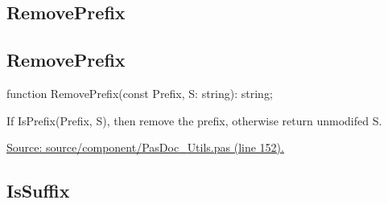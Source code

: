 \documentclass{report}
\newif\ifpdf
\begin{document}
\subsection*{\large{\textbf{RemovePrefix}}\normalsize\hspace{1ex}\hrulefill}
\else
\subsection*{RemovePrefix}
\fi
\label{PasDoc_Utils-RemovePrefix}
\begin{list}{}{
\setlength{\itemindent}{0cm}
\setlength{\listparindent}{0cm}
\setlength{\leftmargin}{\evensidemargin}
\addtolength{\leftmargin}{\tmplength}
\settowidth{\labelsep}{X}
\addtolength{\leftmargin}{\labelsep}
\setlength{\labelwidth}{\tmplength}
}
\item[\textbf{Declaration}\hfill]
\ifpdf
\begin{flushleft}
\fi
\begin{ttfamily}
function RemovePrefix(const Prefix, S: string): string;\end{ttfamily}

\ifpdf
\end{flushleft}
\fi

\par
\item[\textbf{Description}]
If IsPrefix(Prefix, S), then remove the prefix, otherwise return unmodifed S.\par
\href{https://github.com/pasdoc/pasdoc/blob/master/source/component/PasDoc_Utils.pas#L152}{Source: source/component/PasDoc{\_}Utils.pas (line 152).}

\end{list}
\ifpdf
\subsection*{\large{\textbf{IsSuffix}}\normalsize\hspace{1ex}\hrulefill}
\else
\end{document}
